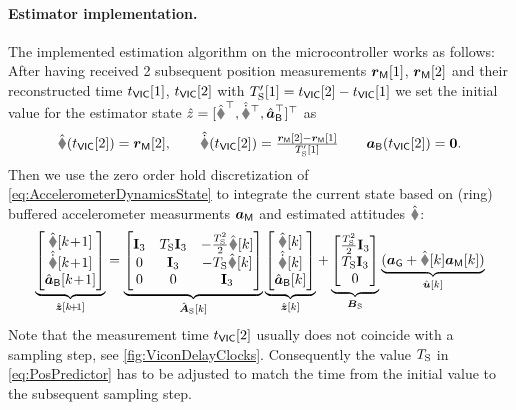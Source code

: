\paragraph{Estimator implementation.}
The implemented estimation algorithm on the microcontroller works as follows:
After having received 2 subsequent position measurements $\boldsymbol{r}_{\mathsf{M}}[1]$, $\boldsymbol{r}_{\mathsf{M}}[2]$ and their reconstructed time $t_{\mathsf{VIC}}[1]$, $t_{\mathsf{VIC}}[2]$ with $T_{\mathrm{S}}'[1]=t_{\mathsf{VIC}}[2]-t_{\mathsf{VIC}}[1]$ we set the initial value for the estimator state $\hat{z} = [\rObs^\top, \rdObs^\top, \aIMUBObs^\top]^\top$ as
\begin{align}
 \rObs(\tVIC[2]) = \rVIC[2], 
\qquad
 \rdObs(\tVIC[2]) = \tfrac{\rVIC[2]-\rVIC[1]}{\Ts'[1]}
\qquad
 \aIMUB(\tVIC[2]) = \tuple{0}.
\end{align}
Then we use the zero order hold discretization of \eqref{eq:AccelerometerDynamicsState} to integrate the current state based on (ring) buffered accelerometer measurments $\boldsymbol{a}_{\mathsf{M}}$ and estimated attitudes $\RObs$:
\begin{align}\label{eq:PosPredictor}
 \underbrace{\begin{bmatrix} \rObs[\kPlusOne] \\ \rdObs[\kPlusOne] \\ \aIMUBObs[\kPlusOne] \end{bmatrix}}_{\hat{\tuple{z}}[\kPlusOne]}
 =
 \underbrace{\begin{bmatrix} \idMat[3] & \Ts\idMat[3] & -\tfrac{\Ts^2}{2}\RObs[k] \\ 0 & \idMat[3] & -\Ts\RObs[k] \\ 0 & 0 & \idMat[3] \end{bmatrix}}_{\hat{\mat{A}}_\idxSamp[k]}
 \underbrace{\begin{bmatrix} \rObs[k] \\ \rdObs[k] \\ \aIMUBObs[k] \end{bmatrix}}_{\hat{\tuple{z}}[k]}
 +
 \underbrace{\begin{bmatrix} \tfrac{\Ts^2}{2}\idMat[3] \\ \Ts \idMat[3] \\ 0 \end{bmatrix}}_{\mat{B}_\idxSamp}
 \underbrace{(\gravityAcc + \RObs[k] \aIMU[k])}_{\hat{\tuple{u}}[k]}
\end{align}
Note that the measurement time $t_{\mathsf{VIC}}[2]$ usually does not coincide with a sampling step, see \autoref{fig:ViconDelayClocks}.
Consequently the value $T_{\mathrm{S}}$ in \eqref{eq:PosPredictor} has to be adjusted to match the time from the initial value to the subsequent sampling step.


